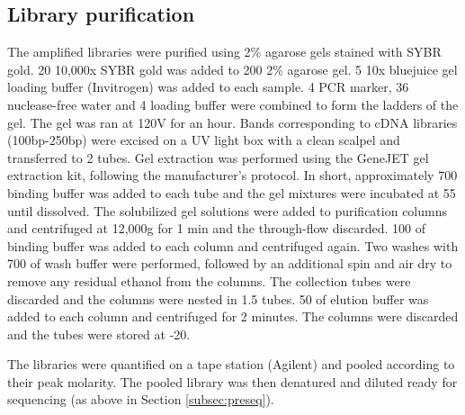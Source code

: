 \subsection{Library purification}
The amplified libraries were purified using 2\% agarose gels stained with SYBR gold.
20\ul{} 10,000x SYBR gold was added to 200\ml{} 2\% agarose gel.
5\ul{} 10x bluejuice gel loading buffer (Invitrogen) was added to each sample.
4\ul{} PCR marker, 36\ul{} nuclease-free water and 4\ul{} loading buffer were combined to form the ladders of the gel.
The gel was ran at 120V for an hour.
Bands corresponding to cDNA libraries (100bp-250bp) were excised on a UV light box with a clean scalpel and transferred to 2\ml{} tubes.
Gel extraction was performed using the GeneJET gel extraction kit, following the manufacturer's protocol.
In short, approximately 700\ul{} binding buffer was added to each tube and the gel mixtures were incubated at 55\C{} until dissolved.
The solubilized gel solutions were added to purification columns and centrifuged at 12,000g for 1 min and the through-flow discarded.
100\ul{} of binding buffer was added to each column and centrifuged again.
Two washes with 700\ul{} of wash buffer were performed, followed by an additional spin and air dry to remove any residual ethanol from the columns.
The collection tubes were discarded and the columns were nested in 1.5\ml{} tubes.
50\ul{} of elution buffer was added to each column and centrifuged for 2 minutes.
The columns were discarded and the tubes were stored at -20\C{}.

The libraries were quantified on a tape station (Agilent) and pooled according to their peak molarity.
The pooled library was then denatured and diluted ready for sequencing (as above in Section \ref{subsec:preseq}).